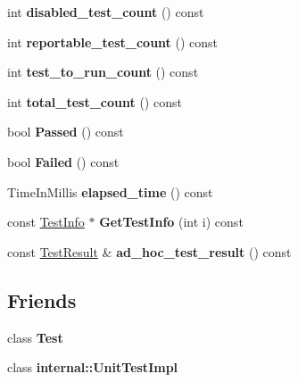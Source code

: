 \begin{DoxyCompactItemize}
int {\bfseries disabled\+\_\+test\+\_\+count} () const
\item 
\mbox{\label{classtesting_1_1_test_case_ae4e69f1a77b6aba274981e987e50acab}} 
int {\bfseries reportable\+\_\+test\+\_\+count} () const
\item 
\mbox{\label{classtesting_1_1_test_case_a57f115315eb756e23be6651bb5e6c638}} 
int {\bfseries test\+\_\+to\+\_\+run\+\_\+count} () const
\item 
\mbox{\label{classtesting_1_1_test_case_aba3cab19aaf7295284f0832f2cf895a3}} 
int {\bfseries total\+\_\+test\+\_\+count} () const
\item 
\mbox{\label{classtesting_1_1_test_case_a29bbfd227b732a90198b5280c039c271}} 
bool {\bfseries Passed} () const
\item 
\mbox{\label{classtesting_1_1_test_case_ae71c30eab6f1673b82090a0e745c2aa5}} 
bool {\bfseries Failed} () const
\item 
\mbox{\label{classtesting_1_1_test_case_acd7d6a77bce06da6ef90f5dad1c4def1}} 
Time\+In\+Millis {\bfseries elapsed\+\_\+time} () const
\item 
\mbox{\label{classtesting_1_1_test_case_a441e0eca232643671dc365c2924c255c}} 
const \mbox{\hyperlink{classtesting_1_1_test_info}{Test\+Info}} $\ast$ {\bfseries Get\+Test\+Info} (int i) const
\item 
\mbox{\label{classtesting_1_1_test_case_a6d5fc5003bc3352f3ddae7dadc6d2364}} 
const \mbox{\hyperlink{classtesting_1_1_test_result}{Test\+Result}} \& {\bfseries ad\+\_\+hoc\+\_\+test\+\_\+result} () const
\end{DoxyCompactItemize}
\subsection*{Friends}
\begin{DoxyCompactItemize}
\item 
\mbox{\label{classtesting_1_1_test_case_a5b78b1c2e1fa07ffed92da365593eaa4}} 
class {\bfseries Test}
\item 
\mbox{\label{classtesting_1_1_test_case_acc0a5e7573fd6ae7ad1878613bb86853}} 
class {\bfseries internal\+::\+Unit\+Test\+Impl}
\end{DoxyCompactItemize}


